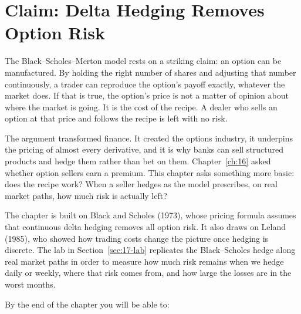 \makeatletter
{}
\makeatother

\chapter{Claim: Delta Hedging Removes Option Risk}
\label{ch:17}

The Black--Scholes--Merton model rests on a striking claim: an option can be manufactured. By holding the right number of shares and adjusting that number continuously, a trader can reproduce the option's payoff exactly, whatever the market does. If that is true, the option's price is not a matter of opinion about where the market is going. It is the cost of the recipe. A dealer who sells an option at that price and follows the recipe is left with no risk.

The argument transformed finance. It created the options industry, it underpins the pricing of almost every derivative, and it is why banks can sell structured products and hedge them rather than bet on them. Chapter~\ref{ch:16} asked whether option sellers earn a premium. This chapter asks something more basic: does the recipe work? When a seller hedges as the model prescribes, on real market paths, how much risk is actually left?

The chapter is built on Black and Scholes (1973), whose pricing formula assumes that continuous delta hedging removes all option risk. It also draws on Leland (1985), who showed how trading costs change the picture once hedging is discrete. The lab in Section~\ref{sec:17-lab} replicates the Black--Scholes hedge along real market paths in order to measure how much risk remains when we hedge daily or weekly, where that risk comes from, and how large the losses are in the worst months.

By the end of the chapter you will be able to:

